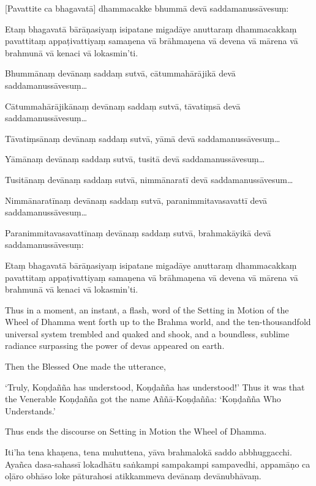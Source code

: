 [Pavattite ca bhagavatā] dhammacakke bhummā devā saddamanussāvesuṃ:

Etaṃ bhagavatā bārāṇasiyaṃ isipatane migadāye anuttaraṃ dhammacakkaṃ
pavattitaṃ appaṭivattiyaṃ samaṇena vā brāhmaṇena vā devena vā mārena vā
brahmunā vā kenaci vā lokasmin'ti.

Bhummānaṃ devānaṃ saddaṃ sutvā, cātummahārājikā devā
saddamanussāvesuṃ\ldots

Cātummahārājikānaṃ devānaṃ saddaṃ sutvā, tāvatiṃsā devā
saddamanussāvesuṃ\ldots

Tāvatiṃsānaṃ devānaṃ saddaṃ sutvā, yāmā devā saddamanussāvesuṃ\ldots

Yāmānaṃ devānaṃ saddaṃ sutvā, tusitā devā saddamanussāvesuṃ\ldots

Tusitānaṃ devānaṃ saddaṃ sutvā, nimmānaratī devā saddamanussāvesum\ldots

Nimmānaratīnaṃ devānaṃ saddaṃ sutvā, paranimmitavasavattī devā
saddamanussāvesuṃ\ldots

Paranimmitavasavattīnaṃ devānaṃ saddaṃ sutvā, brahmakāyikā devā
saddamanussāvesuṃ:

Etaṃ bhagavatā bārāṇasiyaṃ isipatane migadāye anuttaraṃ dhammacakkaṃ
pavattitaṃ appaṭivattiyaṃ samaṇena vā brāhmaṇena vā devena vā mārena vā
brahmunā vā kenaci vā lokasmin'ti.

\clearpage

\englishText
\markboth{\englishTitle}{\rightmark}

Thus in a moment, an instant, a flash, word of the Setting in Motion of
the Wheel of Dhamma went forth up to the Brahma world, and the
ten-thousandfold universal system trembled and quaked and shook, and a
boundless, sublime radiance surpassing the power of devas appeared on
earth.

Then the Blessed One made the utterance,

‘Truly, Koṇḍañña has understood, Koṇḍañña has understood!’ Thus it was
that the Venerable Koṇḍañña got the name Aññā-Koṇḍañña: ‘Koṇḍañña Who
Understands.’

Thus ends the discourse on Setting in Motion the Wheel of Dhamma.

\clearpage

\paliText
\markboth{\paliTitle}{\rightmark}

Iti'ha tena khaṇena, tena muhuttena, yāva brahmalokā saddo abbhuggacchi.
Ayañca dasa-sahassī lokadhātu saṅkampi sampakampi sampavedhi, appamāṇo ca
oḷāro obhāso loke pāturahosi atikkammeva devānaṃ devānubhāvaṃ.

